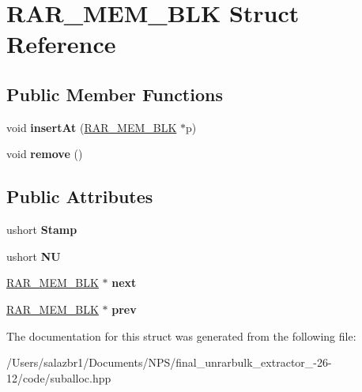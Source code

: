 \hypertarget{struct_r_a_r___m_e_m___b_l_k}{\section{R\-A\-R\-\_\-\-M\-E\-M\-\_\-\-B\-L\-K Struct Reference}
\label{struct_r_a_r___m_e_m___b_l_k}
}
\subsection*{Public Member Functions}
\begin{DoxyCompactItemize}
\item 
\hypertarget{struct_r_a_r___m_e_m___b_l_k_a24250539a4782ae1123c45761dd02c3d}{void {\bfseries insert\-At} (\hyperlink{struct_r_a_r___m_e_m___b_l_k}{R\-A\-R\-\_\-\-M\-E\-M\-\_\-\-B\-L\-K} $\ast$p)}\label{struct_r_a_r___m_e_m___b_l_k_a24250539a4782ae1123c45761dd02c3d}

\item 
\hypertarget{struct_r_a_r___m_e_m___b_l_k_a2243ea47f0d20e5aea3f135644d0d650}{void {\bfseries remove} ()}\label{struct_r_a_r___m_e_m___b_l_k_a2243ea47f0d20e5aea3f135644d0d650}

\end{DoxyCompactItemize}
\subsection*{Public Attributes}
\begin{DoxyCompactItemize}
\item 
\hypertarget{struct_r_a_r___m_e_m___b_l_k_a231016f32ddf618d2bd45e1bd9a3ce30}{ushort {\bfseries Stamp}}\label{struct_r_a_r___m_e_m___b_l_k_a231016f32ddf618d2bd45e1bd9a3ce30}

\item 
\hypertarget{struct_r_a_r___m_e_m___b_l_k_acf65bd87944af48c267af39d944659c0}{ushort {\bfseries N\-U}}\label{struct_r_a_r___m_e_m___b_l_k_acf65bd87944af48c267af39d944659c0}

\item 
\hypertarget{struct_r_a_r___m_e_m___b_l_k_a00b111c79bfb785132cc91be7feca366}{\hyperlink{struct_r_a_r___m_e_m___b_l_k}{R\-A\-R\-\_\-\-M\-E\-M\-\_\-\-B\-L\-K} $\ast$ {\bfseries next}}\label{struct_r_a_r___m_e_m___b_l_k_a00b111c79bfb785132cc91be7feca366}

\item 
\hypertarget{struct_r_a_r___m_e_m___b_l_k_a5cd36a6b342112a9adfdc07a538af31e}{\hyperlink{struct_r_a_r___m_e_m___b_l_k}{R\-A\-R\-\_\-\-M\-E\-M\-\_\-\-B\-L\-K} $\ast$ {\bfseries prev}}\label{struct_r_a_r___m_e_m___b_l_k_a5cd36a6b342112a9adfdc07a538af31e}

\end{DoxyCompactItemize}


The documentation for this struct was generated from the following file\-:\begin{DoxyCompactItemize}
\item 
/\-Users/salazbr1/\-Documents/\-N\-P\-S/final\-\_\-unrarbulk\-\_\-extractor\-\_-\/26-\/12/code/suballoc.\-hpp\end{DoxyCompactItemize}
